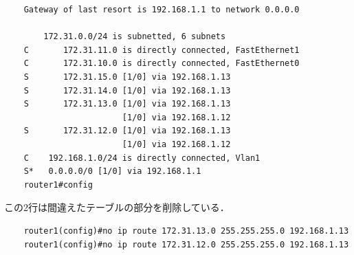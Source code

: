 \documentclass{jlreq}
\begin{document}
\begin{lstlisting}
    Gateway of last resort is 192.168.1.1 to network 0.0.0.0

        172.31.0.0/24 is subnetted, 6 subnets
    C       172.31.11.0 is directly connected, FastEthernet1
    C       172.31.10.0 is directly connected, FastEthernet0
    S       172.31.15.0 [1/0] via 192.168.1.13
    S       172.31.14.0 [1/0] via 192.168.1.13
    S       172.31.13.0 [1/0] via 192.168.1.13
                        [1/0] via 192.168.1.12
    S       172.31.12.0 [1/0] via 192.168.1.13
                        [1/0] via 192.168.1.12
    C    192.168.1.0/24 is directly connected, Vlan1
    S*   0.0.0.0/0 [1/0] via 192.168.1.1
    router1#config
    \end{lstlisting}
    この2行は間違えたテーブルの部分を削除している．
    \begin{lstlisting}
    router1(config)#no ip route 172.31.13.0 255.255.255.0 192.168.1.13
    router1(config)#no ip route 172.31.12.0 255.255.255.0 192.168.1.13 
    \end{lstlisting}
\end{document}
